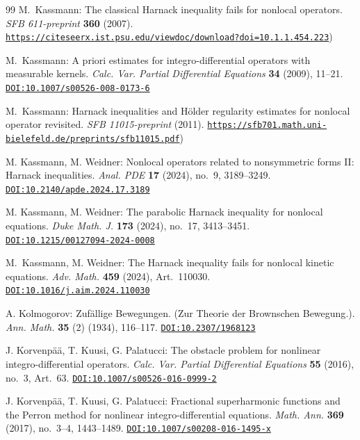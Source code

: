 \documentclass[leqno,10pt]{amsart}
\theoremstyle{plain}
\theoremstyle{remark}
\numberwithin{equation}{section}
\def\vs{\vspace{1mm}}
\begin{document}
{\begin{thebibliography}{99}
\vs {}
{M.~Kassmann}:
The classical Harnack inequality fails for nonlocal operators.
{\it SFB 611-preprint} {\bf 360} (2007).
\href{https://citeseerx.ist.psu.edu/viewdoc/download?doi=10.1.1.454.223andrep=rep1andtype=pdf}{\tt  https://citeseerx.ist.psu.edu/viewdoc/download?doi=10.1.1.454.223})

\vs {}
{M.~Kassmann}:
A priori estimates for integro-differential operators with measurable kernels.
{\it Calc. Var. Partial Differential Equations} {\bf 34} (2009), 11--21.
\href{http://dx.doi.org/10.1007/s00526-008-0173-6}{\tt  DOI:10.1007/s00526-008-0173-6}

\vs {}
{M.~Kassmann}:
Harnack inequalities and H\"older regularity estimates for nonlocal operator revisited.
{\it SFB 11015-preprint} (2011).
\href{https://sfb701.math.uni-bielefeld.de/preprints/sfb11015.pdf}{\tt https://sfb701.math.uni-bielefeld.de/preprints/sfb11015.pdf})

\vs {}
{M. Kassmann, M. Weidner}:
Nonlocal operators related to nonsymmetric forms II: Harnack inequalities.
{\it Anal. PDE} {\bf 17} (2024), no.~9, 3189--3249.
\href{http://dx.doi.org/10.2140/apde.2024.17.3189}{\tt  DOI:10.2140/apde.2024.17.3189}

\vs {}
{M. Kassmann, M. Weidner}:
The parabolic Harnack inequality for nonlocal equations.
{\it Duke Math. J.} {\bf 173} (2024), no.~17, 3413--3451.
\href{http://dx.doi.org/10.1215/00127094-2024-0008}{\tt  DOI:10.1215/00127094-2024-0008}

\vs {}
{M.~Kassmann, M. Weidner}:
The Harnack inequality fails for nonlocal kinetic equations.
{\it Adv. Math.} {\bf 459} (2024), Art.~110030.
\href{http://dx.doi.org/10.1016/j.aim.2024.110030}{\tt  DOI:10.1016/j.aim.2024.110030}



{
\vs {}
{A. Kolmogorov}:
Zuf{\"a}llige {Bewegungen}. ({Zur} {Theorie} der {Brownschen} {Bewegung}.).
{\it Ann. Math.} {\bf 35} (2) (1934), 116--117.
\href{http://dx.doi.org/10.2307/1968123}{\tt DOI:10.2307/1968123}
}

\vs {}
{J. Korvenp\"a\"a, T. Kuusi, G. Palatucci}:
The obstacle problem for nonlinear integro-differential operators.
{\it Calc. Var. Partial Differential Equations} {\bf 55} (2016), no.~3, Art.~63.
\href{http://dx.doi.org/10.1007/s00526-016-0999-2}{\tt   DOI:10.1007/s00526-016-0999-2}

\vs {}
{J. Korvenp\"a\"a, T. Kuusi, G. Palatucci}:
Fractional superharmonic functions and the Perron method for nonlinear integro-differential equations.
{\it Math. Ann.} {\bf 369} (2017), no.~3--4, 1443--1489.
\href{http://dx.doi.org/10.1007/s00208-016-1495-x}{\tt   DOI:10.1007/s00208-016-1495-x}



\end{thebibliography}}
\end{document}
